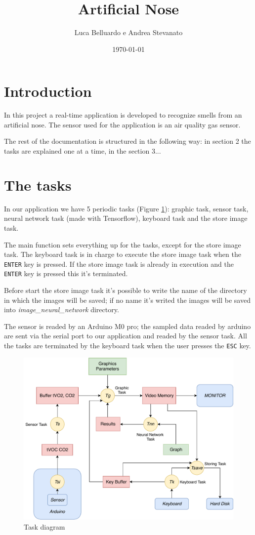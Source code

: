 \documentclass[12pt]{article}
\title{Artificial Nose}
\author{Luca Belluardo e Andrea Stevanato}
\date{\today}
\begin{document}
\maketitle
\tableofcontents

\section{Introduction}
In this project a real-time application is developed to recognize smells from an
artificial nose. The sensor used for the application is an air quality gas sensor.

The rest of the documentation is structured in the following way: in section
2 the tasks are explained one at a time, in the section 3...

\section{The tasks}
In our application we have 5 periodic tasks (Figure \ref{tdiagram}): graphic
task, sensor task, neural network task (made with Tensorflow), keyboard task
and the store image task.

The main function sets everything up for the tasks, except for the store
image task. The keyboard task is in charge to execute the store image task
when the \texttt{ENTER} key is pressed. If the store image task is already in
execution and the \texttt{ENTER} key is pressed this it's terminated.

Before start the store image task it's possible to write the name of the
directory in which the images will be saved; if no name it's writed the
images will be saved into \textit{image\_neural\_network} directory.

The sensor is readed by an Arduino M0 pro; the sampled data readed by arduino
are sent via the serial port to our application and readed by the sensor
task. All the tasks are terminated by the keyboard task when the user presses
the \texttt{ESC} key.

\begin{figure}[!t]
    \includegraphics[width=\textwidth]{diagram.pdf}
    \caption{Task diagram}
    \label{tdiagram}
\end{figure}
\end{document}
